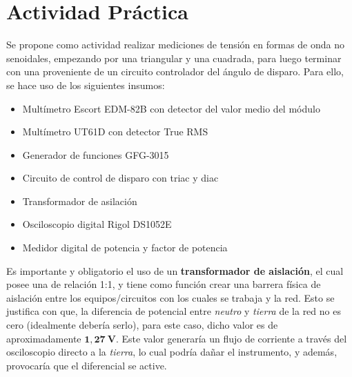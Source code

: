   \pagebreak
  \section{Actividad Práctica}
    Se propone como actividad realizar mediciones de tensión en formas de onda no senoidales,
    empezando por una triangular y una cuadrada, para luego terminar con una proveniente
    de un circuito controlador del ángulo de disparo. Para ello, se hace uso de los siguientes
    insumos:

    \begin{itemize}
      \item Multímetro Escort EDM-82B con detector del valor medio del módulo
      \item Multímetro UT61D con detector True RMS
      \item Generador de funciones GFG-3015
      \item Circuito de control de disparo con triac y diac
      \item Transformador de asilación
      \item Osciloscopio digital Rigol DS1052E
      \item Medidor digital de potencia y factor de potencia
    \end{itemize}
    
    Es importante y obligatorio el uso de un \textbf{transformador de aislación},
    el cual posee una de relación 1:1, y tiene como función crear una barrera física de aislación
    entre los equipos/circuitos con los cuales se trabaja y la red. Esto se justifica con que, la diferencia de
    potencial entre \textit{neutro} y \textit{tierra} de la red no es cero (idealmente debería serlo), para este caso, dicho
    valor es de aproximadamente $\mathbf{1,27\ V}$. Este valor generaría un flujo de corriente a través del osciloscopio 
    directo a la \textit{tierra}, lo cual podría dañar el instrumento, y además, provocaría que el diferencial se active.

    
    
    
